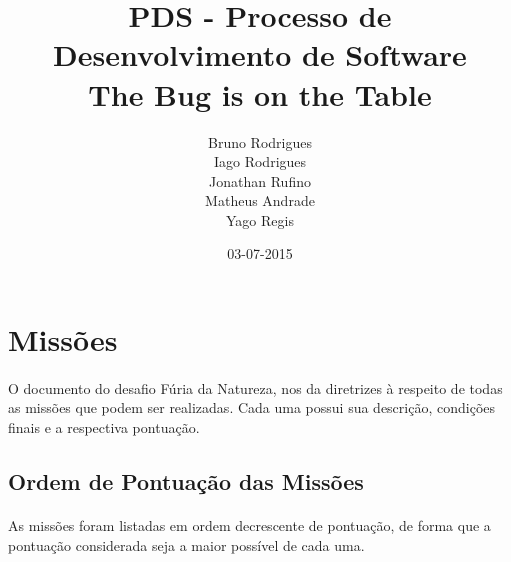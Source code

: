 \documentclass{article}
\title{PDS - Processo de Desenvolvimento de Software\\The Bug is on the Table}
\date{03-07-2015}
\author{Bruno Rodrigues\\Iago Rodrigues\\Jonathan Rufino\\Matheus Andrade\\Yago Regis}
\begin{document}
	\maketitle
	\newpage

\newpage
\listoffigures

\newpage
\listoftables

\newpage
\tableofcontents

\newpage
\section{Missões}
	\paragraph{}
		O documento do desafio Fúria da Natureza, nos da diretrizes à respeito de todas as missões que podem ser realizadas. Cada uma possui sua descrição, condições finais e a respectiva pontuação.

	\subsection{Ordem de Pontuação das Missões}
		\paragraph{}
			As missões foram listadas em ordem decrescente de pontuação, de forma que a pontuação considerada seja a maior possível de cada uma.
\end{document}
